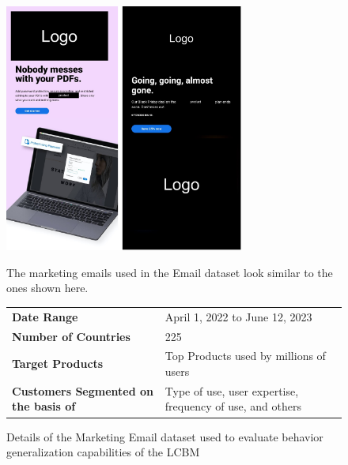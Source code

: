 \begin{figure}[!t]
\begin{minipage}{\textwidth}
    \centering
    \includegraphics[width=0.7\textwidth]{images/email-ex-logo-redacted.pdf}
    \caption{The \companyName marketing emails used in the Email dataset look similar to the ones shown here.}
    \label{fig:figure-email-example}
\end{minipage}
\hfill
\begin{minipage}{\textwidth}\hspace{4pt}
\centering
\begin{adjustbox}{max width = 1.0\textwidth}\scriptsize
\begin{tabularx}{0.7\textwidth}{XX}\toprule[1.5pt]
\textbf{Date Range} & April 1, 2022 to June 12, 2023 \\
\textbf{Number of Countries} & 225 \\
\textbf{Target Products} & Top Products used by millions of users\\ %
\textbf{Customers Segmented on the basis of} & Type of use, user expertise, frequency of use, and others\\
\bottomrule[1.5pt]
\end{tabularx}
\end{adjustbox}
\caption{Details of the \companyName Marketing Email dataset used to evaluate behavior generalization capabilities of the LCBM
\label{table:email dataset}}
\end{minipage}
\end{figure}   


